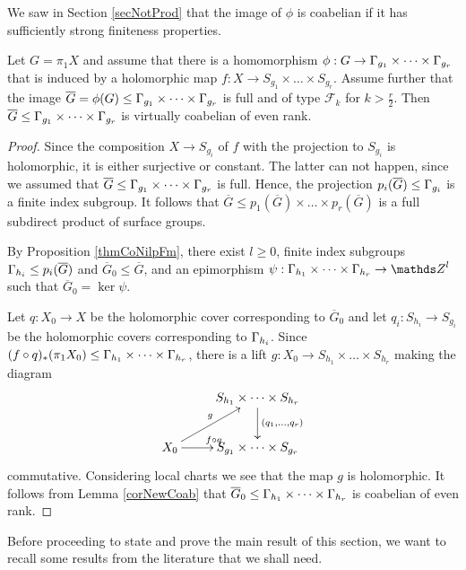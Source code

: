 We saw in Section \ref{secNotProd} that the image of $\phi$ is coabelian if it has sufficiently strong finiteness properties.
\begin{proposition}
Let $G=\pi_1 X$ and assume that there is a homomorphism $\phi: G\rightarrow \Gamma_{g_1}\times \dots \times \Gamma_{g_r}$ that is induced by a holomorphic map $f: X \rightarrow S_{g_1}\times \dots \times S_{g_r}$. Assume further that the image $\overline{G}=\phi(G)\leq \Gamma_{g_1}\times \dots \times \Gamma_{g_r}$ is full and of type $\mathcal{F}_k$ for $k>\frac{r}{2}$. Then $\overline{G} \leq \Gamma_{g_1}\times \dots \times \Gamma_{g_r}$ is virtually coabelian of even rank.
\label{propNewCoab}
\end{proposition}
\begin{proof}
 Since the composition $X\rightarrow S_{g_i}$ of $f$ with the projection to $S_{g_i}$ is holomorphic, it is either surjective or constant. The latter can not happen, since we assumed that $\overline{G}\leq \Gamma_{g_1}\times \dots \times \Gamma_{g_r}$ is full. Hence, the projection $p_i(\overline{G})\leq \Gamma_{g_i}$ is a finite index subgroup. It follows that $\overline{G}\leq p_1(\overline{G})\times \dots \times p_r(\overline{G})$ is a full subdirect product of surface groups.
 
By Proposition \ref{thmCoNilpFm}, there exist $l\geq 0$, finite index subgroups $\Gamma_{h_i}\leq p_i(\overline{G})$ and $\overline{G}_0\leq \overline{G}$, and an epimorphism $\psi: \G_{h_1}\times \dots \times \G_{h_r}\rightarrow \ZZ^l$ such that $\overline{G}_0=\ker \psi$. 

Let $q: X_0\rightarrow X$ be the holomorphic cover corresponding to $\overline{G}_0$ and let $q_i: S_{h_i}\rightarrow S_{g_i}$ be the holomorphic covers corresponding to $\Gamma_{h_i}$. Since $(f\circ q)_{\ast} (\pi_1 X_0)\leq \Gamma_{h_1}\times \dots \times \Gamma_{h_r}$, there is a lift $g: X_0 \rightarrow S_{h_1}\times \dots \times S_{h_r}$ making the diagram
\[
\xymatrix{ & S_{h_1}\times \dots \times S_{h_r}\ar[d]^{(q_1,\dots,q_r)}\\
		   X_0 \ar[ur]^g \ar[r]^{f\circ q} & S_{g_1}\times \dots \times S_{g_r}}
\]
commutative. Considering local charts we see that the map $g$ is holomorphic. It follows from Lemma \ref{corNewCoab} that $\overline{G}_0\leq \Gamma_{h_1}\times \dots \times \Gamma_{h_r}$ is coabelian of even rank.
\end{proof}


Before proceeding to state and prove the main result of this section, we want to recall some results from the literature that we shall need.

